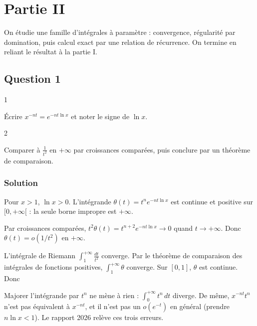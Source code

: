 \documentclass[11pt,a4paper]{article}
\newcommand{\equationajustee}[1]{%
  \sbox{\boiteequation}{$\displaystyle #1$}%
  \ifdim\wd\boiteequation>\linewidth
    \[\resizebox{\linewidth}{!}{\usebox{\boiteequation}}\]%
  \else
    \[#1\]%
  \fi}
\begin{document}
\hypertarget{partie-ii}{%
\section{Partie II}\label{partie-ii}}

On étudie une famille d'intégrales à paramètre : convergence, régularité par domination, puis calcul exact par une relation de récurrence. On termine en reliant le résultat à la partie I.

\hypertarget{question-1-2}{%
\subsection{Question 1}\label{question-1-2}}

\begin{indication}{1}

Écrire \(x^{-nt}=e^{-nt\ln x}\) et noter le signe de \(\ln x\).

\end{indication}

\begin{indication}{2}

Comparer à \(\frac1{t^2}\) en \(+\infty\) par croissances comparées, puis conclure par un théorème de comparaison.

\end{indication}

\hypertarget{solution-19}{%
\subsubsection{Solution}\label{solution-19}}

Pour \(x>1\), \(\ln x>0\). L'intégrande \(\theta(t)=t^ne^{-nt\ln x}\) est continue et positive sur \([0,+\infty[\) : la seule borne impropre est \(+\infty\).

Par croissances comparées, \(t^2\theta(t)=t^{n+2}e^{-nt\ln x}\to0\) quand \(t\to+\infty\). Donc \(\theta(t)=o(1/t^2)\) en \(+\infty\).

L'intégrale de Riemann \(\int_1^{+\infty}\frac{dt}{t^2}\) converge. Par le théorème de comparaison des intégrales de fonctions positives, \(\int_1^{+\infty}\theta\) converge. Sur \([0,1]\), \(\theta\) est continue. Donc

\equationajustee{\boxed{G_n(x)\ \text{converge pour tout}\ x>1}}

\begin{piege}

Majorer l'intégrande par \(t^n\) ne mène à rien : \(\int_0^{+\infty}t^n\,dt\) diverge. De même, \(x^{-nt}t^n\) n'est pas équivalent à \(x^{-nt}\), et il n'est pas un \(o(e^{-t})\) en général (prendre \(n\ln x<1\)). Le rapport 2026 relève ces trois erreurs.

\end{piege}
\end{document}
